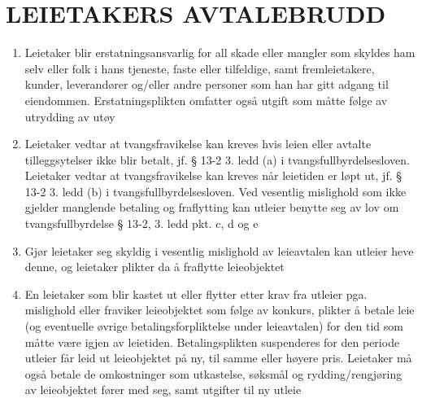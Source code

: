 \section{LEIETAKERS AVTALEBRUDD}


    \begin{enumerate}


        \item Leietaker blir erstatningsansvarlig for all skade eller mangler som skyldes ham selv eller folk i hans
        tjeneste, faste eller tilfeldige, samt fremleietakere, kunder, leverandører og/eller andre personer som han
        har gitt adgang til eiendommen. Erstatningsplikten omfatter også utgift som måtte følge av utrydding av
        utøy

        \item Leietaker vedtar at tvangsfravikelse kan kreves hvis leien eller avtalte tilleggsytelser ikke blir betalt, jf.
        § 13-2 3. ledd (a) i tvangsfullbyrdelsesloven. Leietaker vedtar at tvangsfravikelse kan kreves når leietiden
        er løpt ut, jf. § 13-2 3. ledd (b) i tvangsfullbyrdelsesloven. Ved vesentlig mislighold som ikke gjelder manglende betaling og fraflytting kan utleier benytte seg av lov om tvangsfullbyrdelse § 13-2, 3. ledd pkt. c, d og e

        \item Gjør leietaker seg skyldig i vesentlig mislighold av leieavtalen kan utleier heve denne, og leietaker
        plikter da å fraflytte leieobjektet

        \item En leietaker som blir kastet ut eller flytter etter krav fra utleier pga. mislighold eller fraviker
        leieobjektet som følge av konkurs, plikter å betale leie (og eventuelle øvrige betalingsforpliktelse under
        leieavtalen) for den tid som måtte være igjen av leietiden. Betalingsplikten suspenderes for den periode
        utleier får leid ut leieobjektet på ny, til samme eller høyere pris. Leietaker må også betale de
        omkostninger som utkastelse, søksmål og rydding/rengjøring av leieobjektet fører med seg, samt utgifter
        til ny utleie


    \end{enumerate}
